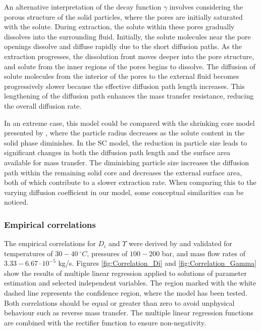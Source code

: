 \documentclass[a4paper,fleqn]{cas-dc}
\begin{document}
	An alternative interpretation of the decay function $\gamma$ involves considering the porous structure of the solid particles, where the pores are initially saturated with the solute. During extraction, the solute within these pores gradually dissolves into the surrounding fluid. Initially, the solute molecules near the pore openings dissolve and diffuse rapidly due to the short diffusion paths. As the extraction progresses, the dissolution front moves deeper into the pore structure, and solute from the inner regions of the pores begins to dissolve. The diffusion of solute molecules from the interior of the pores to the external fluid becomes progressively slower because the effective diffusion path length increases. This lengthening of the diffusion path enhances the mass transfer resistance, reducing the overall diffusion rate. 
	
	In an extreme case, this model could be compared with the shrinking core model presented by \citet{Goto1996}, where the particle radius decreases as the solute content in the solid phase diminishes. In the SC model, the reduction in particle size leads to significant changes in both the diffusion path length and the surface area available for mass transfer. The diminishing particle size increases the diffusion path within the remaining solid core and decreases the external surface area, both of which contribute to a slower extraction rate. When comparing this to the varying diffusion coefficient in our model, some conceptual similarities can be noticed.
	
	\subsubsection{Empirical correlations}
	
	The empirical correlations for $D_i$ and $\Upsilon$ were derived by \citet{Sliczniuk2024} and validated for temperatures of $30 - 40~^\circ C$, pressures of $100 - 200$ bar, and mass flow rates of $3.33-6.67 \cdot 10^{-5}$ kg/s. Figures \ref{fig:Correlation_Di} and \ref{fig:Correlation_Gamma} show the results of multiple linear regression applied to solutions of parameter estimation and selected independent variables. The region marked with the white dashed line represents the confidence region, where the model has been tested. Both correlations should be equal or greater than zero to avoid unphysical behaviour such as  reverse mass transfer. The multiple linear regression functions are combined with the rectifier function to ensure non-negativity.
	
\end{document}
